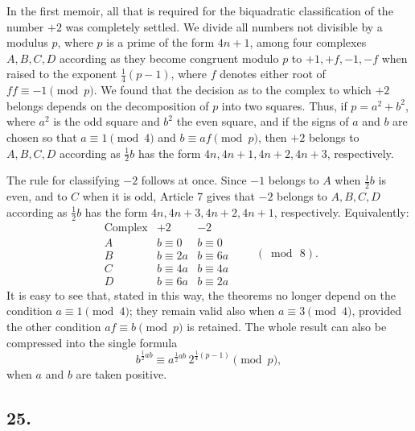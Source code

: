 \documentclass[12pt]{article}
\begin{document}
In the first memoir, all that is required for the biquadratic classification of the number $+2$ was completely settled. We divide all numbers not divisible by a modulus $p$, where $p$ is a prime of the form $4n+1$, among four complexes $A,B,C,D$ according as they become congruent modulo $p$ to $+1,+f,-1,-f$ when raised to the exponent $\frac14(p-1)$, where $f$ denotes either root of $ff\equiv-1\pmod p$. We found that the decision as to the complex to which $+2$ belongs depends on the decomposition of $p$ into two squares. Thus, if $p=a^2+b^2$, where $a^2$ is the odd square and $b^2$ the even square, and if the signs of $a$ and $b$ are chosen so that $a\equiv1\pmod4$ and $b\equiv af\pmod p$, then $+2$ belongs to $A,B,C,D$ according as $\frac12 b$ has the form $4n,4n+1,4n+2,4n+3$, respectively.

The rule for classifying $-2$ follows at once. Since $-1$ belongs to $A$ when $\frac12 b$ is even, and to $C$ when it is odd, Article 7 gives that $-2$ belongs to $A,B,C,D$ according as $\frac12 b$ has the form $4n,4n+3,4n+2,4n+1$, respectively. Equivalently:
\[
\begin{array}{c|cc}
\text{Complex} & +2 & -2\\
\hline
A & b\equiv 0 & b\equiv 0\\
B & b\equiv 2a & b\equiv 6a\\
C & b\equiv 4a & b\equiv 4a\\
D & b\equiv 6a & b\equiv 2a
\end{array}
\qquad(\bmod\,8).
\]
It is easy to see that, stated in this way, the theorems no longer depend on the condition $a\equiv1\pmod4$; they remain valid also when $a\equiv3\pmod4$, provided the other condition $af\equiv b\pmod p$ is retained. The whole result can also be compressed into the single formula
\[
b^{\frac12ab}\equiv a^{\frac12ab}\,2^{\frac14(p-1)}\pmod p,
\]
when $a$ and $b$ are taken positive.

\subsection*{25.}
\end{document}

